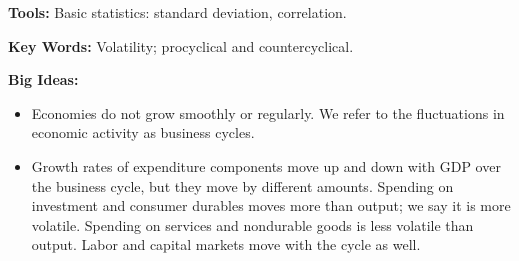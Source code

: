\textbf{Tools: }Basic statistics: standard deviation, correlation.

\textbf{Key Words:} Volatility; procyclical and countercyclical.

\textbf{Big Ideas:}
\begin{itemize}
    \item Economies do not grow smoothly or regularly. We refer to the fluctuations in economic activity as business cycles.
    \item Growth rates of expenditure components move up and down with GDP over the business cycle, but they move by different amounts. Spending on investment and consumer durables moves more than output; we say it is more volatile. Spending on services and nondurable goods is less volatile than output. Labor and capital markets move with the cycle as well.
\end{itemize}
